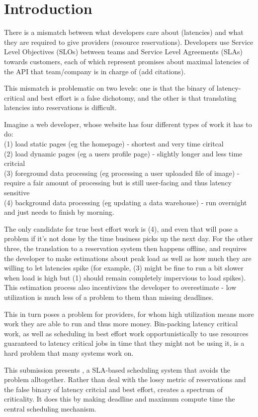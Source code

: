 \section{Introduction}

There is a mismatch between what developers care about (latencies) and what they
are required to give providers (resource reservations). Developers use Service
Level Objectives (SLOs) between teams and Service Level Agreements (SLAs)
towards customers, each of which represent promises about maximal latencies of
the API that team/company is in charge of (add citations). 

This mismatch is problematic on two levels: one is that the binary of
latency-critical and best effort is a false dichotomy, and the other is that
translating latencies into reservations is difficult. 

Imagine a web developer, whose website has four different types of work it has
to do: \\
(1) load static pages (eg the homepage) - shortest and very time ciritcal \\
(2) load dynamic pages (eg a users profile page) - slightly longer and less time
critcial \\
(3) foreground data processing (eg processing a user uploaded file of image) -
require a fair amount of processing but is still user-facing and thus latency sensitive \\
(4) background data processing (eg updating a data warehouse) - run overnight
and just needs to finish by morning.

The only candidate for true best effort work is (4), and even that will pose a
problem if it's not done by the time business picks up the next day. For the
other three, the translation to a reservation system then happens offline, and
requires the developer to make estimations about peak load as well as how much
they are willing to let latencies spike (for example, (3) might be fine to run a
bit slower when load is high but (1) should remain completely impervious to load
spikes). This estimation process also incentivizes the developer to overestimate
- low utilization is much less of a problem to them than missing deadlines. 

This in turn poses a problem for providers, for whom high utilization means more
work they are able to run and thus more money. Bin-packing latency critical
work, as well as scheduling in best effort work opportunistically to use
resources guaranteed to latency critical jobs in time that they might not be
using it, is a hard problem that many systems work on.

This submission presents \textit{\sysname}, a SLA-based scheduling system that
avoids the problem alltogether. Rather than deal with the lossy metric of
reservations and the false binary of latency critcial and best effort,
\sysname{} creates a spectrum of criticality. It does this by making deadline
and maximum compute time the central scheduling mechanism.
